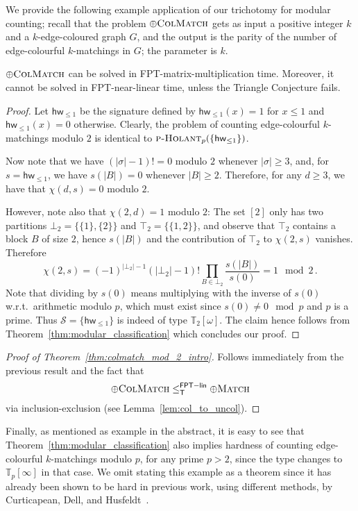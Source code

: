 \documentclass[authorcolumns,numberwithinsect]{no-lipics-v2022}
\newcommand{\fptlinred}{\leq^{\mathsf{FPT-lin}}_{\mathsf{T}}}
\newcommand{\holantprob}{\text{\sc{p-Holant}}}
\begin{document}
We provide the following example application of our trichotomy for modular counting; recall that the problem $\oplus\textsc{ColMatch}$ gets as input a positive integer $k$ and a $k$-edge-coloured graph $G$, and the output is the parity of the number of edge-colourful $k$-matchings in $G$; the parameter is $k$.
\begin{corollary}
    $\oplus\textsc{ColMatch}$ can be solved in FPT-matrix-multiplication time. Moreover, it cannot be solved in FPT-near-linear time, unless the Triangle Conjecture fails.
\end{corollary}
\begin{proof}
    Let $\mathsf{hw}_{\leq 1}$ be the signature defined by $\mathsf{hw}_{\leq 1}(x)=1$ for $x\leq 1$ and $\mathsf{hw}_{\leq 1}(x)=0$ otherwise. Clearly, the problem of counting edge-colourful $k$-matchings modulo $2$ is identical to $\holantprob_p(\{\mathsf{hw}_{\leq 1}\})$. 
    
    Now note that we have $(|\sigma|-1)!=0$ modulo $2$ whenever $|\sigma| \geq 3$, and, for $s=\mathsf{hw}_{\leq 1}$, we have $s(|B|)=0$ whenever $|B|\geq 2$. Therefore, for any $d\geq 3$, we have that $\chi(d,s)=0$ modulo $2$.

    However, note also that $\chi(2,d)=1$ modulo $2$: The set $[2]$ only has two partitions $\bot_2=\{\{1\},\{2\}\}$ and $\top_2=\{\{1,2\}\}$, and observe that $\top_2$ contains a block $B$ of size $2$, hence $s(|B|)$ and the contribution of $\top_2$ to $\chi(2,s)$ vanishes. Therefore 
    \[ \chi(2,s) = (-1)^{|\bot_2|-1}(|\bot_2|-1)! \prod_{B\in \bot_2} \frac{s(|B|)}{s(0)} = 1 \mod 2 \,. \]
    Note that dividing by $s(0)$ means multiplying with the inverse of $s(0)$ w.r.t.\ arithmetic modulo $p$, which must exist since $s(0)\neq 0\mod p$ and $p$ is a prime.
    Thus $\mathcal{S}=\{\mathsf{hw}_{\leq 1}\}$ is indeed of type $\mathbb{T}_2[\mathsf{\omega}]$. The claim hence follows from Theorem~\ref{thm:modular_classification} which concludes our proof.
\end{proof}

\begin{proof}[Proof of Theorem~\ref{thm:colmatch_mod_2_intro}]
    Follows immediately from the previous result and the fact that \[\oplus\textsc{ColMatch}\fptlinred\oplus\textsc{Match}\] via inclusion-exclusion (see Lemma~\ref{lem:col_to_uncol}).
\end{proof}

Finally, as mentioned as example in the abstract, it is easy to see that Theorem~\ref{thm:modular_classification} also implies hardness of counting edge-colourful $k$-matchings modulo $p$, for any prime $p>2$, since the type changes to $\mathbb{T}_p[\infty]$ in that case. We omit stating this example as a theorem since it has already been shown to be hard in previous work, using different methods, by Curticapean, Dell, and Husfeldt~\cite{CurticapeanDH21}.
\end{document}
